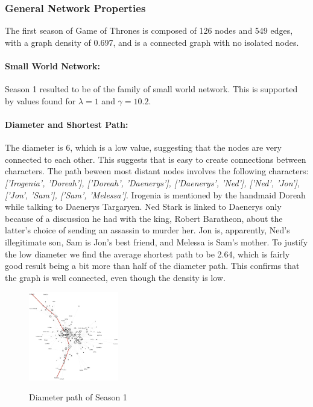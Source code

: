 \documentclass[10pt,twocolumn,letterpaper]{article}
\begin{document}
\subsubsection{General Network Properties}

The first season of Game of Thrones is composed of 126 nodes and 549 edges, with a graph density of 0.697, and is a connected graph with no isolated nodes.

\paragraph{Small World Network:} Season 1 resulted to be of the family of small world network. This is supported by values found for $\lambda=1$ and $\gamma=10.2$.

\paragraph{Diameter and Shortest Path:}

The diameter is 6, which is a low value, suggesting that the nodes are very connected to each other. This suggests that is easy to create connections between characters. The path beween most distant nodes involves the following characters: \textit{['Irogenia', 'Doreah'], ['Doreah', 'Daenerys'], ['Daenerys', 'Ned'], ['Ned', 'Jon'], ['Jon', 'Sam'], ['Sam', 'Melessa']}. Irogenia is mentioned by the handmaid Doreah while talking to Daenerys Targaryen. Ned Stark is linked to Daenerys only because of a discussion he had with the king, Robert Baratheon, about the latter's choice of sending an assassin to murder her. Jon is, apparently, Ned's illegitimate son, Sam is Jon's best friend, and Melessa is Sam's mother.
To justify the low diameter we find the average shortest path to be 2.64, which is fairly good result being a bit more than half of the diameter path. This confirms that the graph is well connected, even though the density is low.

\begin{figure}[!h]
    \includegraphics[width=0.35\textwidth]{img/s1/diameter_path.jpg} \\
    \caption{\small{Diameter path of Season 1}}
\end{figure}
\end{document}
